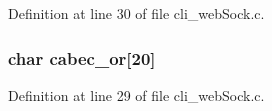 Definition at line 30 of file cli\_\-webSock.c.

\hypertarget{group__CHAT_ga6936bd73a531977d0e65e15a3875a50e}{
\subsubsection[{cabec\_\-or}]{\setlength{\rightskip}{0pt plus 5cm}char {\bf cabec\_\-or}\mbox{[}20\mbox{]}}}
\label{group__CHAT_ga6936bd73a531977d0e65e15a3875a50e}


Definition at line 29 of file cli\_\-webSock.c.


